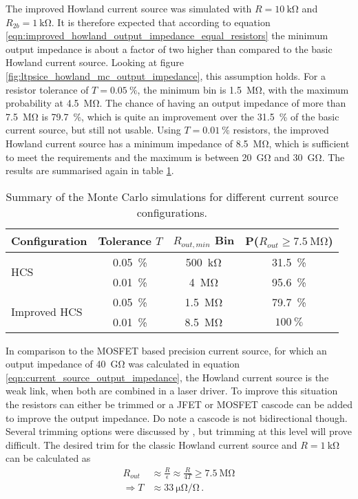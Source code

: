 The improved Howland current source was simulated with $R=\qty{10}{\kilo\ohm}$ and $R_{2b} = \qty{1}{\kilo\ohm}$. It is therefore expected that according to equation \ref{eqn:improved_howland_output_impedance_equal_resistors} the minimum output impedance is about a factor of two higher than compared to the basic Howland current source. Looking at figure \ref{fig:ltpsice_howland_mc_output_impedance}, this assumption holds. For a resistor tolerance of $T=\qty{0.05}{\percent}$, the minimum bin is \qty{1.5}{\mega\ohm}, with the maximum probability at \qty{4.5}{\mega\ohm}. The chance of having an output impedance of more than \qty{7.5}{\mega\ohm} is \qty{79.7}{\percent}, which is quite an improvement over the \qty{31.5}{\percent} of the basic current source, but still not usable. Using $T=\qty{0.01}{\percent}$ resistors, the improved Howland current source has a minimum impedance of \qty{8.5}{\mega\ohm}, which is sufficient to meet the requirements and the maximum is between \qty{20}{\giga\ohm} and \qty{30}{\giga\ohm}. The results are summarised again in table \ref{tab:howland_current_source_summary}.
\begin{table}[hb]
    \centering
    \begin{tabular}{lccc}
        \toprule
        Configuration& Tolerance $T$ & $R_{out, min}$ Bin& P($R_{out} \geq \qty{7.5}{\mega\ohm}$) \\
        \midrule
        \multirow{2}{*}{HCS} & \qty{0.05}{\percent}& \qty{500}{\kilo\ohm}& \qty{31.5}{\percent}\\
        & \qty{0.01}{\percent} & \qty{4}{\mega\ohm}& \qty{95.6}{\percent} \\
        \multirow{2}{*}{Improved HCS} & \qty{0.05}{\percent}& \qty{1.5}{\mega\ohm}& \qty{79.7}{\percent} \\
        & \qty{0.01}{\percent}& \qty{8.5}{\mega\ohm}& $\qty{100}{\percent}$\\
        \bottomrule
    \end{tabular}
    \caption{Summary of the Monte Carlo simulations for different current source configurations.}
    \label{tab:howland_current_source_summary}
\end{table}

In comparison to the MOSFET based precision current source, for which an output impedance of \qty{40}{\giga\ohm} was calculated in equation \ref{eqn:current_source_output_impedance}, the Howland current source is the weak link, when both are combined in a laser driver. To improve this situation the resistors can either be trimmed or a JFET or MOSFET cascode can be added to improve the output impedance. Do note a cascode is not bidirectional though. Several trimming options were discussed by \citeauthor{howland_pease} \cite{howland_pease}, but trimming at this level will prove difficult. The desired trim for the classic Howland current source and $R=\qty{1}{\kilo\ohm}$ can be calculated as
\begin{align*}
    R_{out} &\approx \frac{R}{\epsilon} \approx \frac{R}{4T} \geq \qty{7.5}{\mega\ohm}\\
    \Rightarrow T &\approx \qty{33}{\micro\ohm \per\ohm}\,.
\end{align*}

